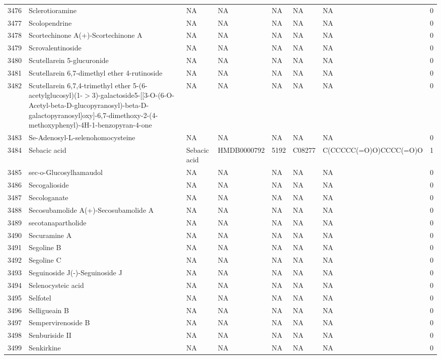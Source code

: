 \documentclass[a4paper]{article}
\begin{document}
\begin{longtable}{rlllllll}
  3476 & Sclerotioramine & NA & NA & NA & NA & NA & 0 \\ 
  3477 & Scolopendrine & NA & NA & NA & NA & NA & 0 \\ 
  3478 & Scortechinone A(+)-Scortechinone A & NA & NA & NA & NA & NA & 0 \\ 
  3479 & Scrovalentinoside & NA & NA & NA & NA & NA & 0 \\ 
  3480 & Scutellarein 5-glucuronide & NA & NA & NA & NA & NA & 0 \\ 
  3481 & Scutellarein 6,7-dimethyl ether 4-rutinoside & NA & NA & NA & NA & NA & 0 \\ 
  3482 & Scutellarein 6,7,4-trimethyl ether 5-(6-acetylglucosyl)(1-$>$3)-galactoside5-[[3-O-(6-O-Acetyl-beta-D-glucopyranosyl)-beta-D-galactopyranosyl]oxy]-6,7-dimethoxy-2-(4-methoxyphenyl)-4H-1-benzopyran-4-one & NA & NA & NA & NA & NA & 0 \\ 
  3483 & Se-Adenosyl-L-selenohomocysteine & NA & NA & NA & NA & NA & 0 \\ 
  3484 & Sebacic acid & Sebacic acid & HMDB0000792 & 5192 & C08277 & C(CCCCC(=O)O)CCCC(=O)O & 1 \\ 
  3485 & sec-o-Glucosylhamaudol & NA & NA & NA & NA & NA & 0 \\ 
  3486 & Secogalioside & NA & NA & NA & NA & NA & 0 \\ 
  3487 & Secologanate & NA & NA & NA & NA & NA & 0 \\ 
  3488 & Secosubamolide A(+)-Secosubamolide A & NA & NA & NA & NA & NA & 0 \\ 
  3489 & secotanapartholide & NA & NA & NA & NA & NA & 0 \\ 
  3490 & Securamine A & NA & NA & NA & NA & NA & 0 \\ 
  3491 & Segoline B & NA & NA & NA & NA & NA & 0 \\ 
  3492 & Segoline C & NA & NA & NA & NA & NA & 0 \\ 
  3493 & Seguinoside J(-)-Seguinoside J & NA & NA & NA & NA & NA & 0 \\ 
  3494 & Selenocysteic acid & NA & NA & NA & NA & NA & 0 \\ 
  3495 & Selfotel & NA & NA & NA & NA & NA & 0 \\ 
  3496 & Selligueain B & NA & NA & NA & NA & NA & 0 \\ 
  3497 & Sempervirenoside B & NA & NA & NA & NA & NA & 0 \\ 
  3498 & Senburiside II & NA & NA & NA & NA & NA & 0 \\ 
  3499 & Senkirkine & NA & NA & NA & NA & NA & 0 \\ 

\end{longtable}
\end{document}
